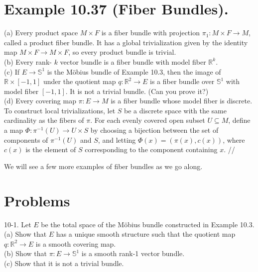 \documentclass[10pt]{article}
\begin{document}
\section*{Example 10.37 (Fiber Bundles).}
(a) Every product space $M \times F$ is a fiber bundle with projection $\pi_{1}: M \times F \rightarrow M$, called a product fiber bundle. It has a global trivialization given by the identity map $M \times F \rightarrow M \times F$, so every product bundle is trivial.\\
(b) Every rank- $k$ vector bundle is a fiber bundle with model fiber $\mathbb{R}^{k}$.\\
(c) If $E \rightarrow \mathbb{S}^{1}$ is the Möbius bundle of Example 10.3, then the image of $\mathbb{R} \times[-1,1]$ under the quotient map $q: \mathbb{R}^{2} \rightarrow E$ is a fiber bundle over $\mathbb{S}^{1}$ with model fiber $[-1,1]$. It is not a trivial bundle. (Can you prove it?)\\
(d) Every covering map $\pi: E \rightarrow M$ is a fiber bundle whose model fiber is discrete. To construct local trivializations, let $S$ be a discrete space with the same cardinality as the fibers of $\pi$. For each evenly covered open subset $U \subseteq M$, define a map $\Phi: \pi^{-1}(U) \rightarrow U \times S$ by choosing a bijection between the set of components of $\pi^{-1}(U)$ and $S$, and letting $\Phi(x)=(\pi(x), c(x))$, where $c(x)$ is the element of $S$ corresponding to the component containing $x$. //

We will see a few more examples of fiber bundles as we go along.

\section*{Problems}
10-1. Let $E$ be the total space of the Möbius bundle constructed in Example 10.3.\\
(a) Show that $E$ has a unique smooth structure such that the quotient map $q: \mathbb{R}^{2} \rightarrow E$ is a smooth covering map.\\
(b) Show that $\pi: E \rightarrow \mathbb{S}^{1}$ is a smooth rank-1 vector bundle.\\
(c) Show that it is not a trivial bundle.
\end{document}
